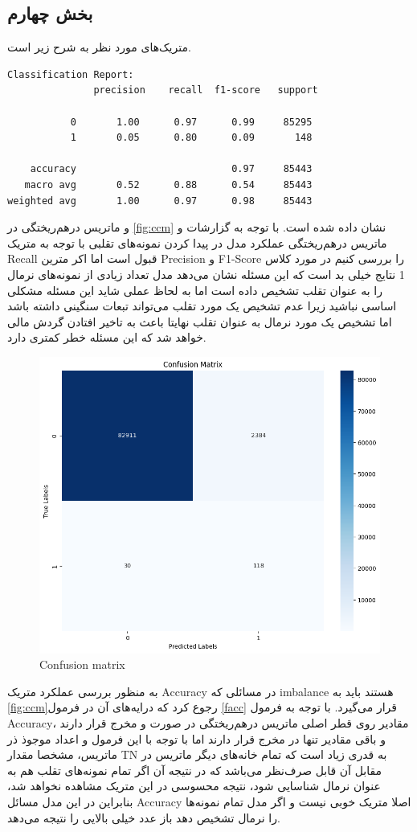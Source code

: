 \documentclass{article}
\begin{document}
\subsection{بخش چهارم}
متریک‌های مورد نظر به شرح زیر است.
\begin{LTR}
\begin{verbatim}
Classification Report:
               precision    recall  f1-score   support

           0       1.00      0.97      0.99     85295
           1       0.05      0.80      0.09       148

    accuracy                           0.97     85443
   macro avg       0.52      0.88      0.54     85443
weighted avg       1.00      0.97      0.98     85443
\end{verbatim}
\end{LTR}
و ماتریس درهم‌ریختگی در 
\autoref{fig:ccm}
 نشان داده شده است. با توجه به گزارشات و ماتریس درهم‌ریختگی عملکرد مدل در پیدا کردن نمونه‌های تقلبی با توجه به متریک Recall قبول است اما اکر مترین Precision و F1-Score را بررسی کنیم در مورد کلاس 1 نتایج خیلی بد است که این مسئله نشان می‌دهد مدل تعداد زیادی از نمونه‌های نرمال را به عنوان تقلب تشخیص داده است اما به لحاظ عملی شاید این مسئله مشکلی اساسی نباشید زیرا عدم تشخیص یک مورد تقلب می‌تواند تبعات سنگینی داشته باشد اما تشخیص یک مورد نرمال به عنوان تقلب نهایتا باعث به تاخیر افتادن گردش مالی خواهد شد که این مسئله خطر کمتری دارد. 
\begin{figure}[H]
\centering
\includegraphics[width=0.7\linewidth]{img/C_cm}
\caption{Confusion matrix}
\label{fig:ccm}
\end{figure}

به منظور بررسی عملکرد متریک Accuracy در مسائلی که imbalance هستند باید به ‎ \autoref{fig:ccm}‎رجوع کرد که درایه‌های آن در فرمول ‎\autoref{facc}‎ قرار می‌گیرد. با توجه به فرمول Accuracy، مقادیر روی قطر اصلی ماتریس درهم‌ریختگی در صورت و مخرج قرار دارند و باقی مقادیر تنها در مخرج قرار دارند اما با توجه با این فرمول و اعداد موجوذ ذر ماتریس، مشخصا مقدار TN به قدری زیاد است که تمام خانه‌های دیگر ماتریس در مقابل آن قابل صرف‌نظر می‌باشد که در نتیجه آن اگر تمام نمونه‌های تقلب هم به عنوان نرمال شناسایی شود، نتیجه محسوسی در این متریک مشاهده نخواهد شد، بنابراین در این مدل مسائل Accuracy اصلا متریک خوبی نیست و اگر مدل تمام نمونه‌ها را نرمال تشخیص دهد باز عدد خیلی بالایی را نتیجه می‌دهد.
\end{document}
